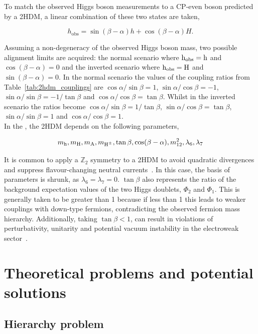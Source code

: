 To match the observed Higgs boson measurements to a \ac{CP}-even boson predicted by a \ac{2HDM}, a linear combination of these two states are taken,

\begin{equation}
h_{\text{obs}} = \sin(\beta-\alpha) h + \cos(\beta-\alpha) H.
\end{equation}

Assuming a non-degeneracy of the observed Higgs boson mass, two possible alignment limits are acquired: the normal scenario where ${\text{h}}_{\text{obs}}={\text{h}}$ and $\cos(\beta-\alpha)=0$ and the inverted scenario where ${\text{h}}_{\text{obs}}={\text{H}}$ and $\sin(\beta-\alpha)=0$.
In the normal scenario the values of the coupling ratios from Table~\ref{tab:2hdm_couplings} are $\cos\alpha/\sin\beta=1$, $\sin\alpha/\cos\beta=-1$, $\sin\alpha/\sin\beta=-1/\tan\beta$ and $\cos\alpha/\cos\beta=\tan\beta$. 
Whilst in the inverted scenario the ratios become $\cos\alpha/\sin\beta=1/\tan\beta$, $\sin\alpha/\cos\beta=\tan\beta$, $\sin\alpha/\sin\beta=1$ and $\cos\alpha/\cos\beta=1$. \\

In the , the \ac{2HDM} depends on the following parameters,

\begin{equation}
m_{{\text{h}}}, m_{{\text{H}}}, m_{{\text{A}}}, m_{{\text{H}^{\pm}}}, \tan\beta, \cos(\beta-\alpha), m_{12}^{2}, \lambda_{6}, \lambda_{7}
\end{equation}

It is common to apply a $\mathbb{Z}_2$ symmetry to a \ac{2HDM} to avoid quadratic divergences and suppress flavour-changing neutral currents~\cite{PhysRevD.15.1958,Ginzburg:2004vp}.
In this case, the basis of parameters is shrunk, as $\lambda_6 = \lambda_7 = 0$.
$\tan\beta$ also represents the ratio of the background expectation values of the two Higgs doublets, $\Phi_2$ and $\Phi_1$.
This is generally taken to be greater than 1 because if less than 1 this leads to weaker couplings with down-type fermions, contradicting the observed fermion mass hierarchy. 
Additionally, taking $\tan\beta < 1$, can result in violations of perturbativity, unitarity and potential vacuum instability in the electroweak sector~\cite{SUSY_Primer}.


\section{Theoretical problems and potential solutions}

\subsection{Hierarchy problem}

